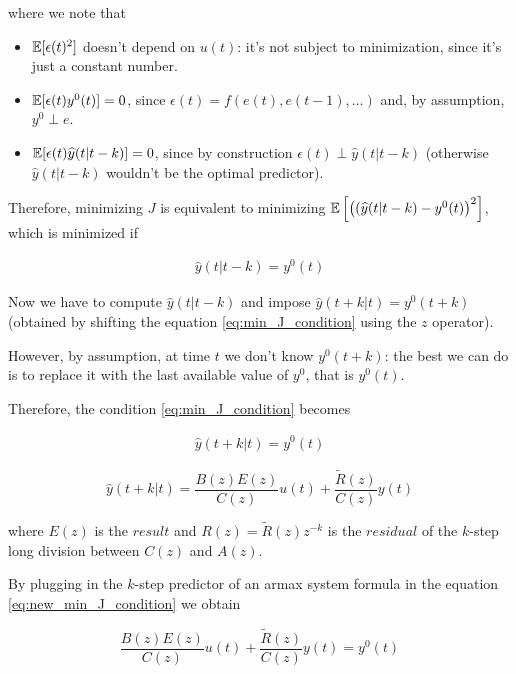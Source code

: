 where we note that

\begin{itemize}
	\item $\mathbb{E} [\epsilon(t)^2 ]$ doesn't depend on $u(t)$: it's not subject to minimization, since it's just a constant number.
	\item $\mathbb{E} [ \epsilon(t) y^0(t) ] = 0$, since $\epsilon(t) = f(e(t), e(t-1), \dots) $ and, by assumption, $y^0 \perp e$.
	\item $\mathbb{E} [ \epsilon(t) \widehat{y}(t|t-k) ] = 0$, since by construction $\epsilon(t) \perp \hat{y}(t|t-k)$ (otherwise $\hat{y}(t|t-k)$ wouldn't be the optimal predictor).
\end{itemize}

Therefore, minimizing $J$ is equivalent to minimizing  $\mathbb{E} \left[ \left( (\widehat{y}(t|t-k) - y^0(t) \right)^2 \right]$, which is minimized if

\begin{align}\label{eq:min_J_condition}
	\hat{y}(t|t-k) = y^0(t)
\end{align}

Now we have to compute $\hat{y}(t|t-k)$ and impose $\hat{y}(t+k|t) = y^0(t+k)$ (obtained by shifting the equation \ref{eq:min_J_condition} using the $z$ operator).

However, by assumption, at time $t$ we don't know $y^0(t+k)$: the best we can do is to replace it with the last available value of $y^0$, that is $y^0(t)$.

Therefore, the condition \ref{eq:min_J_condition} becomes 

\begin{align}\label{eq:new_min_J_condition}
	\hat{y}(t+k|t) = y^0(t)
\end{align}

\begin{recall}

	\[
		\hat{y}(t+k|t) = \frac{B(z) E(z)}{C(z)} u(t) + \frac{\tilde{R}(z)}{C(z)} y(t)
	\] 

	where $E(z)$ is the $result$ and $R(z) = \tilde{R}(z) z^{-k}$ is the $residual$ of the $k$-step long division between $C(z)$ and $A(z)$.

\end{recall}

By plugging in the $k$-step predictor of an \gls{armax} system formula in the equation \ref{eq:new_min_J_condition} we obtain

\[
	\frac{B(z) E(z)}{C(z)} u(t) + \frac{\tilde{R}(z)}{C(z)} y(t) = y^0(t)
\]


